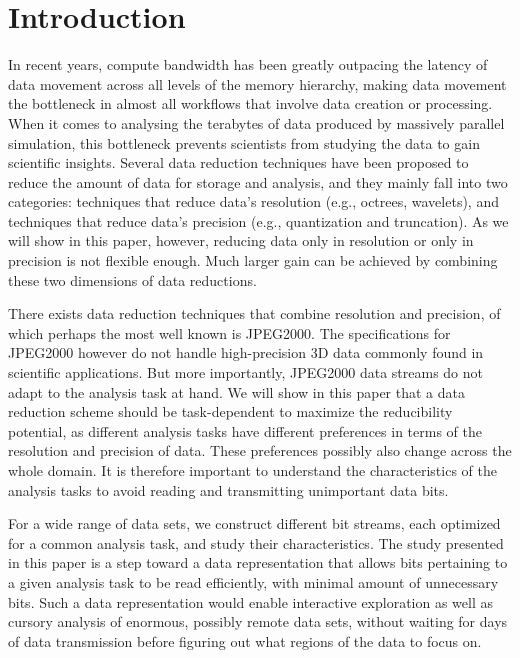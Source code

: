 \section{Introduction}

In recent years, compute bandwidth has been greatly outpacing the latency of data movement across
all levels of the memory hierarchy, making data movement the bottleneck in almost all workflows that
involve data creation or processing. When it comes to analysing the terabytes of data produced by
massively parallel simulation, this bottleneck prevents scientists from studying the data to gain
scientific insights. Several data reduction techniques have been proposed to reduce the amount of
data for storage and analysis, and they mainly fall into two categories: techniques that reduce
data's resolution (e.g., octrees, wavelets), and techniques that reduce data's precision (e.g.,
quantization and truncation). As we will show in this paper, however, reducing data only in
resolution or only in precision is not flexible enough. Much larger gain can be achieved by
combining these two dimensions of data reductions. 

There exists data reduction techniques that combine resolution and precision, of which perhaps the
most well known is JPEG2000. The specifications for JPEG2000 however do not handle high-precision 3D
data commonly found in scientific applications. But more importantly, JPEG2000 data streams do not
adapt to the analysis task at hand. We will show in this paper that a data reduction scheme should
be task-dependent to maximize the reducibility potential, as different analysis tasks have different
preferences in terms of the resolution and precision of data. These preferences possibly also change
across the whole domain. It is therefore important to understand the characteristics of the analysis
tasks to avoid reading and transmitting unimportant data bits.

For a wide range of data sets, we construct different bit streams, each optimized for a common
analysis task, and study their characteristics. The study presented in this paper is a step toward a
data representation that allows bits pertaining to a given analysis task to be read efficiently,
with minimal amount of unnecessary bits. Such a data representation would enable interactive
exploration as well as cursory analysis of enormous, possibly remote data sets, without waiting for
days of data transmission before figuring out what regions of the data to focus on.

